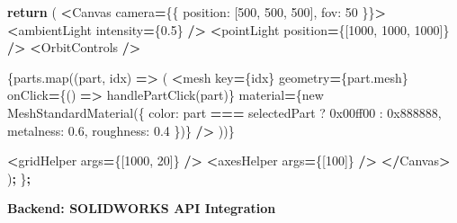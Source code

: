 \documentclass[
]{article}
\newenvironment{Shaded}{\begin{snugshade}}{\end{snugshade}}
\newcommand{\BaseNTok}[1]{\textcolor[rgb]{0.00,0.00,0.81}{#1}}
\newcommand{\BuiltInTok}[1]{#1}
\newcommand{\ControlFlowTok}[1]{\textcolor[rgb]{0.13,0.29,0.53}{\textbf{#1}}}
\newcommand{\DecValTok}[1]{\textcolor[rgb]{0.00,0.00,0.81}{#1}}
\newcommand{\FloatTok}[1]{\textcolor[rgb]{0.00,0.00,0.81}{#1}}
\newcommand{\NormalTok}[1]{#1}
\newcommand{\OperatorTok}[1]{\textcolor[rgb]{0.81,0.36,0.00}{\textbf{#1}}}
\begin{document}
\begin{Shaded}
\begin{Highlighting}[]
  \ControlFlowTok{return}\NormalTok{ (}
    \OperatorTok{\textless{}}\NormalTok{Canvas camera}\OperatorTok{=}\NormalTok{\{\{ position: [}\DecValTok{500}\NormalTok{, }\DecValTok{500}\NormalTok{, }\DecValTok{500}\NormalTok{], fov: }\DecValTok{50}\NormalTok{ \}\}}\OperatorTok{\textgreater{}}
      \OperatorTok{\textless{}}\NormalTok{ambientLight intensity}\OperatorTok{=}\NormalTok{\{}\FloatTok{0.5}\NormalTok{\} }\OperatorTok{/\textgreater{}}
      \OperatorTok{\textless{}}\NormalTok{pointLight position}\OperatorTok{=}\NormalTok{\{[}\DecValTok{1000}\NormalTok{, }\DecValTok{1000}\NormalTok{, }\DecValTok{1000}\NormalTok{]\} }\OperatorTok{/\textgreater{}}
      \OperatorTok{\textless{}}\NormalTok{OrbitControls }\OperatorTok{/\textgreater{}}

\NormalTok{      \{parts.}\BuiltInTok{map}\NormalTok{((part, idx) }\OperatorTok{=\textgreater{}}\NormalTok{ (}
        \OperatorTok{\textless{}}\NormalTok{mesh}
\NormalTok{          key}\OperatorTok{=}\NormalTok{\{idx\}}
\NormalTok{          geometry}\OperatorTok{=}\NormalTok{\{part.mesh\}}
\NormalTok{          onClick}\OperatorTok{=}\NormalTok{\{() }\OperatorTok{=\textgreater{}}\NormalTok{ handlePartClick(part)\}}
\NormalTok{          material}\OperatorTok{=}\NormalTok{\{new MeshStandardMaterial(\{}
\NormalTok{            color: part }\OperatorTok{===}\NormalTok{ selectedPart ? }\BaseNTok{0x00ff00}\NormalTok{ : }\BaseNTok{0x888888}\NormalTok{,}
\NormalTok{            metalness: }\FloatTok{0.6}\NormalTok{,}
\NormalTok{            roughness: }\FloatTok{0.4}
\NormalTok{          \})\}}
        \OperatorTok{/\textgreater{}}
\NormalTok{      ))\}}

      \OperatorTok{\textless{}}\NormalTok{gridHelper args}\OperatorTok{=}\NormalTok{\{[}\DecValTok{1000}\NormalTok{, }\DecValTok{20}\NormalTok{]\} }\OperatorTok{/\textgreater{}}
      \OperatorTok{\textless{}}\NormalTok{axesHelper args}\OperatorTok{=}\NormalTok{\{[}\DecValTok{100}\NormalTok{]\} }\OperatorTok{/\textgreater{}}
    \OperatorTok{\textless{}/}\NormalTok{Canvas}\OperatorTok{\textgreater{}}
\NormalTok{  )}\OperatorTok{;}
\NormalTok{\}}\OperatorTok{;}
\end{Highlighting}
\end{Shaded}

\textbf{Backend: SOLIDWORKS API Integration}
\end{document}
